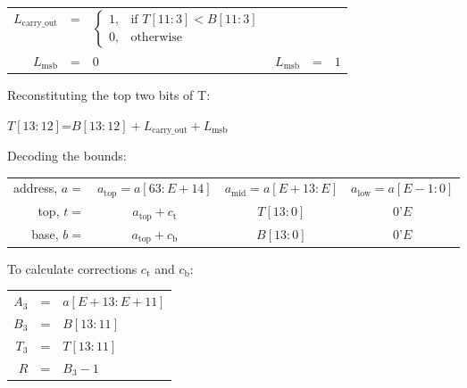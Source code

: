 \begin{figure}
\begin{center}
\begin{tabular}{r c l | r c l}
$L_\text{carry\_out}$ &=& $ \begin{cases}
             1,& \text{if } T[11:3] < B[11:3] \\
             0,& \text{otherwise}
           \end{cases} $ \\

$L_\text{msb}$ &=& $0$                          & $L_\text{msb}$ &=& $1$ \\
\end{tabular}
\end{center}

Reconstituting the top two bits of T:
\begin{center}
$T[13:12] $=$ B[13:12] + L_\text{carry\_out} + L_\text{msb}$
\end{center}

Decoding the bounds:
\begin{center}
{
\renewcommand{\arraystretch}{1.5}
\begin{tabular}{r|c|c|c|}
\cline{2-4}
address, $a =$ & $a_\text{top} = a[63:E+14]$ & $a_\text{mid} = a[E+13:E]$  & $a_\text{low} = a[E-1:0]$ \\ \cline{2-4}
top, $t =$     & $a_\text{top}+c_\text{t}$   & $T[13:0]$                   & $0$'$E$ \\ \cline{2-4}
base, $b =$    & $a_\text{top}+c_\text{b}$   & $B[13:0]$                   & $0$'$E$ \\ \cline{2-4}
\end{tabular}
}
\end{center}

To calculate corrections $c_\text{t}$ and $c_\text{b}$:

\begin{center}
\begin{tabular}{r c l}
  $A_3$ &=& $a[E+13:E+11]$ \\
  $B_3$ &=& $B[13:11]$     \\
  $T_3$ &=& $T[13:11]$     \\
  $R$   &=& $B_3 - 1$      \\
\end{tabular}
\end{center}


\end{figure}
